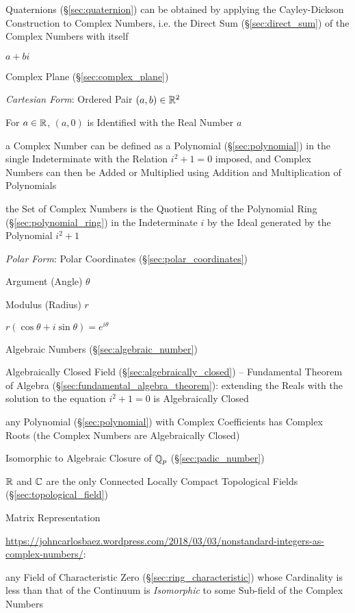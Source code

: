 Quaternions (\S\ref{sec:quaternion}) can be obtained by applying the
Cayley-Dickson Construction to Complex Numbers, i.e. the Direct Sum
(\S\ref{sec:direct_sum}) of the Complex Numbers with itself

$a + bi$

Complex Plane (\S\ref{sec:complex_plane})

\emph{Cartesian Form}: Ordered Pair $(a,b) \in \mathbb{R}^2$

For $a \in \mathbb{R}$, $(a,0)$ is Identified with the Real Number $a$

a Complex Number can be defined as a Polynomial (\S\ref{sec:polynomial}) in the
single Indeterminate with the Relation $i^2 + 1 = 0$ imposed, and Complex
Numbers can then be Added or Multiplied using Addition and Multiplication of
Polynomials

the Set of Complex Numbers is the Quotient Ring of the Polynomial Ring
(\S\ref{sec:polynomial_ring}) in the Indeterminate $i$ by the Ideal generated by
the Polynomial $i^2 + 1$

\emph{Polar Form}: Polar Coordinates (\S\ref{sec:polar_coordinates})

Argument (Angle) $\theta$

Modulus (Radius) $r$

$r(\cos\theta + i \sin\theta) = e^{i\theta}$

Algebraic Numbers (\S\ref{sec:algebraic_number})

Algebraically Closed Field (\S\ref{sec:algebraically_closed}) -- Fundamental
Theorem of Algebra (\S\ref{sec:fundamental_algebra_theorem}): extending the
Reals with the solution to the equation $i^2 + 1 = 0$ is Algebraically Closed

any Polynomial (\S\ref{sec:polynomial}) with Complex Coefficients has Complex
Roots (the Complex Numbers are Algebraically Closed)

Isomorphic to Algebraic Closure of $\mathbb{Q}_p$ (\S\ref{sec:padic_number})

$\mathbb{R}$ and $\mathbb{C}$ are the only Connected Locally Compact
Topological Fields (\S\ref{sec:topological_field})

Matrix Representation %

\url{https://johncarlosbaez.wordpress.com/2018/03/03/nonstandard-integers-as-complex-numbers/}:

any Field of Characteristic Zero (\S\ref{sec:ring_characteristic}) whose
Cardinality is less than that of the Continuum is \emph{Isomorphic} to some
Sub-field of the Complex Numbers

